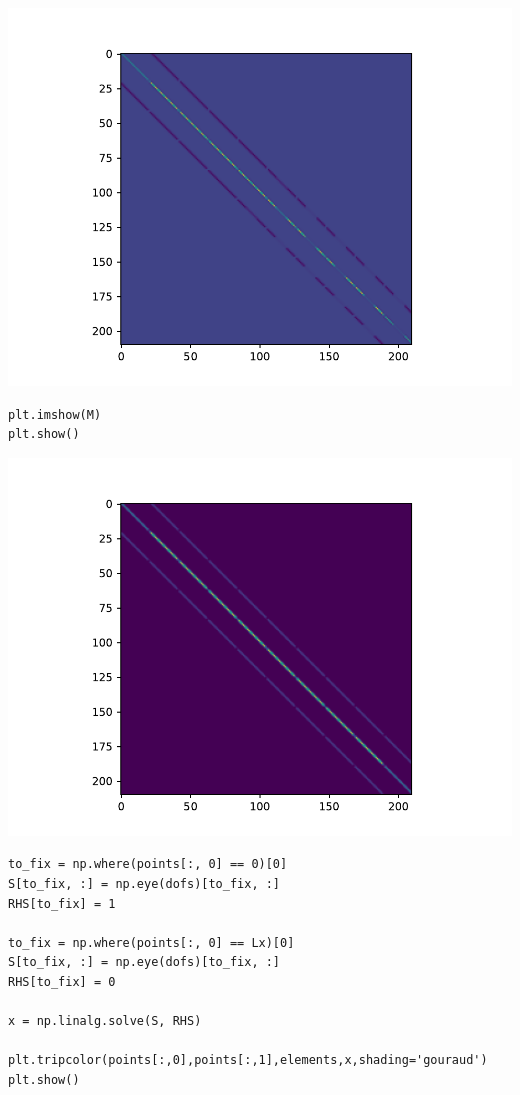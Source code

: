 \includegraphics{heat_files/figure-latex/unnamed-chunk-1-2.pdf}

\begin{verbatim}
plt.imshow(M)
plt.show()
\end{verbatim}

\includegraphics{heat_files/figure-latex/unnamed-chunk-1-3.pdf}

\begin{verbatim}
to_fix = np.where(points[:, 0] == 0)[0]
S[to_fix, :] = np.eye(dofs)[to_fix, :]
RHS[to_fix] = 1

to_fix = np.where(points[:, 0] == Lx)[0]
S[to_fix, :] = np.eye(dofs)[to_fix, :]
RHS[to_fix] = 0

x = np.linalg.solve(S, RHS)

plt.tripcolor(points[:,0],points[:,1],elements,x,shading='gouraud')
plt.show()
\end{verbatim}

